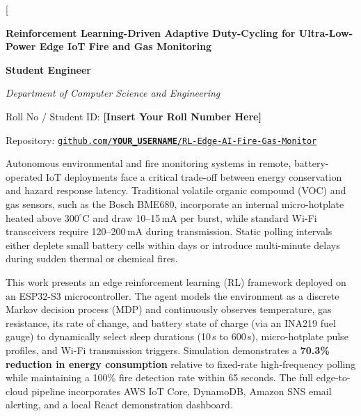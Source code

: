 \documentclass[10pt,twocolumn]{article}
\newcommand{\papertitle}{Reinforcement Learning-Driven Adaptive Duty-Cycling for Ultra-Low-Power Edge IoT Fire and Gas Monitoring}
\begin{document}
\twocolumn[
  \begin{center}
    {\LARGE\bfseries\color{circuitblue} \papertitle}\par\vspace{10pt}
    {\normalsize\bfseries Student Engineer}\par\vspace{2pt}
    {\small\itshape Department of Computer Science and Engineering}\par\vspace{2pt}
    {\small Roll No / Student ID: \textcolor{flameorange}{\bfseries {[Insert Your Roll Number Here]}}}\par\vspace{2pt}
    {\small Repository: \texttt{\href{https://github.com/YOUR_USERNAME/RL-Edge-AI-Fire-Gas-Monitor}{github.com/\textcolor{flameorange}{\bfseries YOUR\_USERNAME}/RL-Edge-AI-Fire-Gas-Monitor}}}
  \end{center}
  \vspace{10pt}
  \enspace
  Autonomous environmental and fire monitoring systems in remote, battery-operated IoT deployments face a critical trade-off between energy conservation and hazard response latency. Traditional volatile organic compound (VOC) and gas sensors, such as the Bosch BME680, incorporate an internal micro-hotplate heated above $300^\circ$C and draw 10--15\,mA per burst, while standard Wi-Fi transceivers require 120--200\,mA during transmission. Static polling intervals either deplete small battery cells within days or introduce multi-minute delays during sudden thermal or chemical fires.

  This work presents an edge reinforcement learning (RL) framework deployed on an ESP32-S3 microcontroller. The agent models the environment as a discrete Markov decision process (MDP) and continuously observes temperature, gas resistance, its rate of change, and battery state of charge (via an INA219 fuel gauge) to dynamically select sleep durations (10\,s to 600\,s), micro-hotplate pulse profiles, and Wi-Fi transmission triggers. Simulation demonstrates a \textbf{70.3\% reduction in energy consumption} relative to fixed-rate high-frequency polling while maintaining a 100\% fire detection rate within 65 seconds. The full edge-to-cloud pipeline incorporates AWS IoT Core, DynamoDB, Amazon SNS email alerting, and a local React demonstration dashboard.
  \vspace{6pt}
\end{document}
